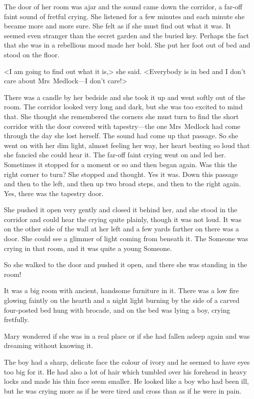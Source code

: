 The door of her room was ajar and the sound came down the corridor, a far-off faint sound of fretful crying. She listened for a few minutes and each minute she became more and more sure. She felt as if she must find out what it was. It seemed even stranger than the secret garden and the buried key. Perhaps the fact that she was in a rebellious mood made her bold. She put her foot out of bed and stood on the floor.

<I am going to find out what it is,> she said. <Everybody is in bed and I don't care about Mrs~Medlock—I don't care!>

There was a candle by her bedside and she took it up and went softly out of the room. The corridor looked very long and dark, but she was too excited to mind that. She thought she remembered the corners she must turn to find the short corridor with the door covered with tapestry—the one Mrs~Medlock had come through the day she lost herself. The sound had come up that passage. So she went on with her dim light, almost feeling her way, her heart beating so loud that she fancied she could hear it. The far-off faint crying went on and led her. Sometimes it stopped for a moment or so and then began again. Was this the right corner to turn? She stopped and thought. Yes it was. Down this passage and then to the left, and then up two broad steps, and then to the right again. Yes, there was the tapestry door.

She pushed it open very gently and closed it behind her, and she stood in the corridor and could hear the crying quite plainly, though it was not loud. It was on the other side of the wall at her left and a few yards farther on there was a door. She could see a glimmer of light coming from beneath it. The Someone was crying in that room, and it was quite a young Someone.

So she walked to the door and pushed it open, and there she was standing in the room!

It was a big room with ancient, handsome furniture in it. There was a low fire glowing faintly on the hearth and a night light burning by the side of a carved four-posted bed hung with brocade, and on the bed was lying a boy, crying fretfully.

Mary wondered if she was in a real place or if she had fallen asleep again and was dreaming without knowing it.

The boy had a sharp, delicate face the colour of ivory and he seemed to have eyes too big for it. He had also a lot of hair which tumbled over his forehead in heavy locks and made his thin face seem smaller. He looked like a boy who had been ill, but he was crying more as if he were tired and cross than as if he were in pain.

